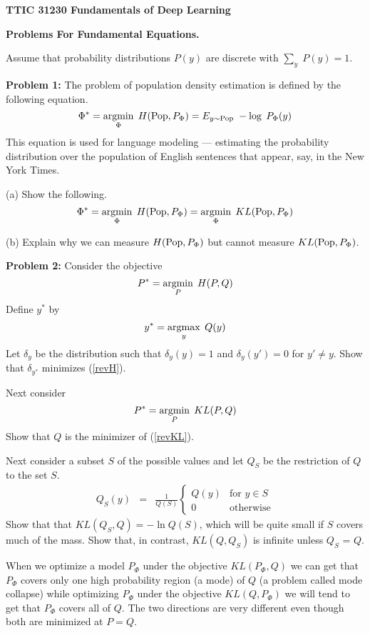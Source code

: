 \documentclass{article}
\begin{document}
\centerline{\bf TTIC 31230 Fundamentals of Deep Learning}
\centerline{\bf Problems For Fundamental Equations.}

\vfill
\vfill
Assume that probability distributions $P(y)$ are discrete with $\sum_y\;P(y) = 1$.

\bigskip
{\bf Problem 1:} The problem of population density estimation is defined by the following equation.
$$\Phi^* = \operatorname*{argmin}_\Phi\;H(\mathrm{Pop},P_\Phi) = E_{y \sim \mathrm{Pop}}\;-\log\;P_\Phi(y)$$
This equation is used for language modeling --- estimating the probability distribution over the population of English sentences that appear, say, in the New York Times.

\medskip
(a) Show the following.
$$\Phi^* = \operatorname*{argmin}_\Phi\;H(\mathrm{Pop},P_\Phi) = \operatorname*{argmin}_\Phi \;KL(\mathrm{Pop},P_\Phi)$$

(b) Explain why we can measure $H(\mathrm{Pop},P_\Phi)$ but cannot measure $KL(\mathrm{Pop},P_\Phi)$.

\bigskip
{\bf Problem 2:} Consider the objective
\begin{equation}
  \label{revH}
  P^* = \operatorname*{argmin}_P\;H(P,Q)
\end{equation}
Define $y^*$ by
$$y^* = \operatorname*{argmax}_y\;Q(y)$$
Let $\delta_y$ be the distribution such that $\delta_y(y) = 1$ and $\delta_y(y') = 0$ for $y' \not = y$.
Show that $\delta_{y^*}$ minimizes (\ref{revH}).

Next consider
\begin{equation}
  \label{revKL}
  P^* = \operatorname*{argmin}_P\;KL(P,Q)
\end{equation}
Show that $Q$ is the minimizer of (\ref{revKL}).

Next consider a subset $S$ of the possible values and let $Q_S$ be the restriction of $Q$ to the set $S$.
\begin{eqnarray*}
  Q_S(y) & = & \frac{1}{Q(S)}\left\{\begin{array}{ll} Q(y) & \mbox{for $y \in S$} \\ 0 & \mbox{otherwise} \end{array}\right.
\end{eqnarray*}
Show that that $KL(Q_S,Q) = -\ln Q(S)$, which will be quite small if $S$ covers much of the mass. Show that, in contrast, $KL(Q,Q_S)$ is infinite unless
$Q_S$ = $Q$.

When we optimize a model $P_\Phi$ under the objective $KL(P_\Phi,Q)$ we can get that $P_\Phi$ covers only one high probability region (a mode) of $Q$ (a problem called mode collapse)
while optimizing $P_\Phi$ under the objective $KL(Q,P_\Phi)$ we will tend to get that $P_\Phi$ covers all of $Q$.  The two directions are very different even though both
are minimized at $P = Q$.
\end{document}
